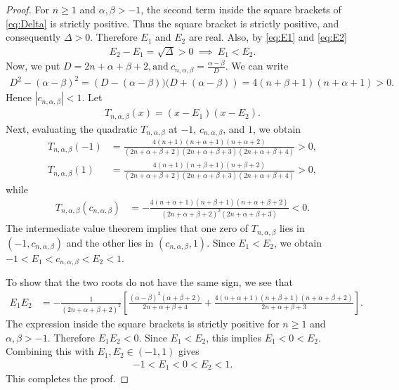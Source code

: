 \documentclass[final,3p,times,12pt]{elsarticle}
\numberwithin{equation}{section}  %
\begin{document}
	\begin{proof}
		For $n\geq1$ and $\alpha,\beta>-1$, the second term inside the square brackets of \eqref{eq:Delta} is strictly positive. Thus
		the square bracket is strictly positive, and consequently $	\Delta>0.$
		Therefore $E_1$ and $E_2$ are real. Also, by
		\eqref{eq:E1} and \eqref{eq:E2}
		\begin{align*}
			E_2-E_1=\sqrt{\Delta}>0 ~\implies ~	E_1<E_2.
		\end{align*}
	Now, we put $\displaystyle  D=2n+\alpha+\beta+2,
\text{and}~
	c_{n,\alpha,\beta}	=
	\frac{\alpha-\beta}{D}.$
	We can write
		\begin{align*}
			D^2-(\alpha-\beta)^2=	\left(D-(\alpha-\beta)\bigr)\bigl(D+(\alpha-\beta)\right)
	=	4(n+\beta+1)(n+\alpha+1)>0.
		\end{align*}
	Hence $|c_{n,\alpha,\beta}|<1$.	Let
		\begin{align*}
			T_{n,\alpha,\beta}(x)=(x-E_1)(x-E_2).
		\end{align*}
Next, evaluating the quadratic $T_{n,\alpha,\beta}$ at $-1$, $c_{n,\alpha,\beta}$, and $1$,
we obtain
		\begin{align*}
			T_{n,\alpha,\beta}(-1)	&=	\frac{	4(n+1)(n+\alpha+1)(n+\alpha+2)	}{
				(2n+\alpha+\beta+2)(2n+\alpha+\beta+3)(2n+\alpha+\beta+4)	}>0,\\[4pt]
			T_{n,\alpha,\beta}(1)&=	\frac{4(n+1)(n+\beta+1)(n+\beta+2)}{	(2n+\alpha+\beta+2)(2n+\alpha+\beta+3)(2n+\alpha+\beta+4)}>0,
		\end{align*}
		while
		\begin{align*}
			T_{n,\alpha,\beta}(c_{n,\alpha,\beta})&=	-\frac{	4(n+\alpha+1)(n+\beta+1)(n+\alpha+\beta+2)}{
				(2n+\alpha+\beta+2)^2(2n+\alpha+\beta+3)}<0.
		\end{align*}
The intermediate value theorem implies that one zero of
		$T_{n,\alpha,\beta}$ lies in $(-1,c_{n,\alpha,\beta})$ and the other lies in $(c_{n,\alpha,\beta},1)$. Since
		$E_1<E_2$, we obtain $-1<E_1<c_{n,\alpha,\beta}<E_2<1.$

To show that the two roots do not have the same sign, we see that
		\begin{align*}
			E_1E_2	&=	-\frac{1}{(2n+\alpha+\beta+2)^2}	\left[
			\frac{(\alpha-\beta)^2(\alpha+\beta+2)}	{2n+\alpha+\beta+4}	+
			\frac{4(n+\alpha+1)(n+\beta+1)(n+\alpha+\beta+2)}	{2n+\alpha+\beta+3}	\right].
		\end{align*}
		The expression inside the square brackets is strictly positive for
		$n\geq1$ and $\alpha,\beta>-1$. Therefore $	E_1E_2<0.$
		Since $E_1<E_2$, this implies $	E_1<0<E_2.$
		Combining this with $E_1,E_2\in(-1,1)$ gives
		\begin{align*}
			-1<E_1<0<E_2<1.
		\end{align*}
		This completes the proof.
	\end{proof}
\end{document}
